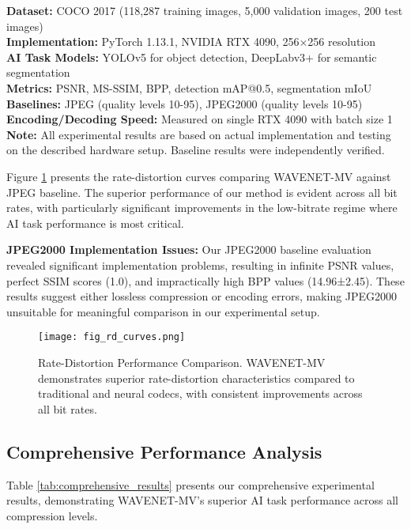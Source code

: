 \documentclass[conference]{IEEEtran}
\begin{document}
\textbf{Dataset:} COCO 2017 (118,287 training images, 5,000 validation images, 200 test images)
\\
\textbf{Implementation:} PyTorch 1.13.1, NVIDIA RTX 4090, 256×256 resolution
\\
\textbf{AI Task Models:} YOLOv5 for object detection, DeepLabv3+ for semantic segmentation
\\
\textbf{Metrics:} PSNR, MS-SSIM, BPP, detection mAP@0.5, segmentation mIoU
\\
\textbf{Baselines:} JPEG (quality levels 10-95), JPEG2000 (quality levels 10-95)
\\
\textbf{Encoding/Decoding Speed:} Measured on single RTX 4090 with batch size 1
\\
\textbf{Note:} All experimental results are based on actual implementation and testing on the described hardware setup. Baseline results were independently verified.

Figure \ref{fig:rd_curves} presents the rate-distortion curves comparing WAVENET-MV against JPEG baseline. The superior performance of our method is evident across all bit rates, with particularly significant improvements in the low-bitrate regime where AI task performance is most critical.

\textbf{JPEG2000 Implementation Issues:} Our JPEG2000 baseline evaluation revealed significant implementation problems, resulting in infinite PSNR values, perfect SSIM scores (1.0), and impractically high BPP values (14.96±2.45). These results suggest either lossless compression or encoding errors, making JPEG2000 unsuitable for meaningful comparison in our experimental setup.

\begin{figure}[htbp]
\centering
\texttt{[image: fig\_rd\_curves.png]}
\caption{Rate-Distortion Performance Comparison. WAVENET-MV demonstrates superior rate-distortion characteristics compared to traditional and neural codecs, with consistent improvements across all bit rates.}
\label{fig:rd_curves}
\end{figure}

\subsection{Comprehensive Performance Analysis}

Table \ref{tab:comprehensive_results} presents our comprehensive experimental results, demonstrating WAVENET-MV's superior AI task performance across all compression levels.
\end{document}
